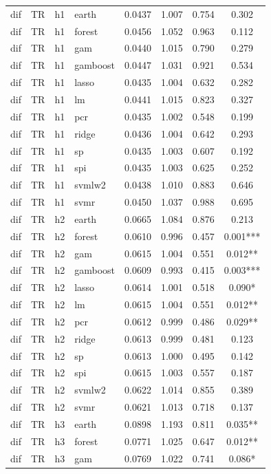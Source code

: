 \begin{ThreePartTable}
\begin{longtable}[t]{llclcccc}
\addlinespace
dif & TR & h1 & earth & 0.0437 & 1.007 & 0.754 & 0.302\\
dif & TR & h1 & forest & 0.0456 & 1.052 & 0.963 & 0.112\\
dif & TR & h1 & gam & 0.0440 & 1.015 & 0.790 & 0.279\\
dif & TR & h1 & gamboost & 0.0447 & 1.031 & 0.921 & 0.534\\
dif & TR & h1 & lasso & 0.0435 & 1.004 & 0.632 & 0.282\\
dif & TR & h1 & lm & 0.0441 & 1.015 & 0.823 & 0.327\\
dif & TR & h1 & pcr & 0.0435 & 1.002 & 0.548 & 0.199\\
dif & TR & h1 & ridge & 0.0436 & 1.004 & 0.642 & 0.293\\
dif & TR & h1 & sp & 0.0435 & 1.003 & 0.607 & 0.192\\
dif & TR & h1 & spi & 0.0435 & 1.003 & 0.625 & 0.252\\
dif & TR & h1 & svmlw2 & 0.0438 & 1.010 & 0.883 & 0.646\\
dif & TR & h1 & svmr & 0.0450 & 1.037 & 0.988 & 0.695\\
\addlinespace
dif & TR & h2 & earth & 0.0665 & 1.084 & 0.876 & 0.213\\
dif & TR & h2 & forest & 0.0610 & 0.996 & 0.457 & 0.001***\\
dif & TR & h2 & gam & 0.0615 & 1.004 & 0.551 & 0.012**\\
dif & TR & h2 & gamboost & 0.0609 & 0.993 & 0.415 & 0.003***\\
dif & TR & h2 & lasso & 0.0614 & 1.001 & 0.518 & 0.090*\\
dif & TR & h2 & lm & 0.0615 & 1.004 & 0.551 & 0.012**\\
dif & TR & h2 & pcr & 0.0612 & 0.999 & 0.486 & 0.029**\\
dif & TR & h2 & ridge & 0.0613 & 0.999 & 0.481 & 0.123\\
dif & TR & h2 & sp & 0.0613 & 1.000 & 0.495 & 0.142\\
dif & TR & h2 & spi & 0.0615 & 1.003 & 0.557 & 0.187\\
dif & TR & h2 & svmlw2 & 0.0622 & 1.014 & 0.855 & 0.389\\
dif & TR & h2 & svmr & 0.0621 & 1.013 & 0.718 & 0.137\\
\addlinespace
dif & TR & h3 & earth & 0.0898 & 1.193 & 0.811 & 0.035**\\
dif & TR & h3 & forest & 0.0771 & 1.025 & 0.647 & 0.012**\\
dif & TR & h3 & gam & 0.0769 & 1.022 & 0.741 & 0.086*\\

\end{longtable}
\end{ThreePartTable}
